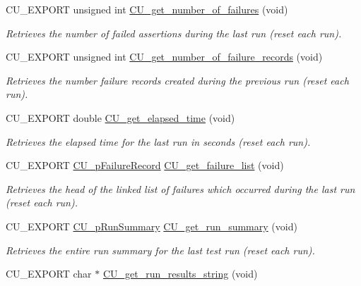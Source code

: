 \begin{DoxyCompactItemize}
C\-U\-\_\-\-E\-X\-P\-O\-R\-T unsigned int \hyperlink{group__Framework_ga5715f679af053504c7c74c4dc67f00d8}{C\-U\-\_\-get\-\_\-number\-\_\-of\-\_\-failures} (void)
\begin{DoxyCompactList}\small\item\em Retrieves the number of failed assertions during the last run (reset each run). \end{DoxyCompactList}\item 
C\-U\-\_\-\-E\-X\-P\-O\-R\-T unsigned int \hyperlink{group__Framework_ga359a5f43045406d42978b5d7a9bd4632}{C\-U\-\_\-get\-\_\-number\-\_\-of\-\_\-failure\-\_\-records} (void)
\begin{DoxyCompactList}\small\item\em Retrieves the number failure records created during the previous run (reset each run). \end{DoxyCompactList}\item 
C\-U\-\_\-\-E\-X\-P\-O\-R\-T double \hyperlink{group__Framework_ga80bc7ff46505762ac47c0997be1a32a4}{C\-U\-\_\-get\-\_\-elapsed\-\_\-time} (void)
\begin{DoxyCompactList}\small\item\em Retrieves the elapsed time for the last run in seconds (reset each run). \end{DoxyCompactList}\item 
C\-U\-\_\-\-E\-X\-P\-O\-R\-T \hyperlink{group__Framework_gafe3d04f76bf2fac18a3b6a9fd9368308}{C\-U\-\_\-p\-Failure\-Record} \hyperlink{group__Framework_ga29e70990caa96ba6570bd6503650c4e7}{C\-U\-\_\-get\-\_\-failure\-\_\-list} (void)
\begin{DoxyCompactList}\small\item\em Retrieves the head of the linked list of failures which occurred during the last run (reset each run). \end{DoxyCompactList}\item 
C\-U\-\_\-\-E\-X\-P\-O\-R\-T \hyperlink{group__Framework_gad47d258dca538a934dccaeab9392b391}{C\-U\-\_\-p\-Run\-Summary} \hyperlink{group__Framework_gad51994a28ffa19ba06b6c803d2796d94}{C\-U\-\_\-get\-\_\-run\-\_\-summary} (void)
\begin{DoxyCompactList}\small\item\em Retrieves the entire run summary for the last test run (reset each run). \end{DoxyCompactList}\item 
C\-U\-\_\-\-E\-X\-P\-O\-R\-T char $\ast$ \hyperlink{group__Framework_ga829a4792d9de45459cc9e874f240ca5b}{C\-U\-\_\-get\-\_\-run\-\_\-results\-\_\-string} (void)

\end{DoxyCompactItemize}
